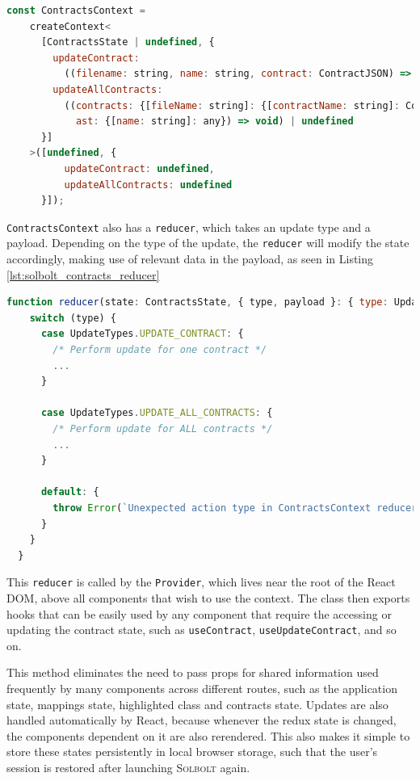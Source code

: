 \begin{lstlisting}[language=Javascript, caption={\texttt{ContractsContext} used for managing contract state}, label={lst:solbolt_contracts_context}, basicstyle=\ttfamily\scriptsize]
  const ContractsContext = 
    createContext<
      [ContractsState | undefined, {
        updateContract: 
          ((filename: string, name: string, contract: ContractJSON) => void) | undefined, 
        updateAllContracts: 
          ((contracts: {[fileName: string]: {[contractName: string]: ContractJSON}}, 
            ast: {[name: string]: any}) => void) | undefined
      }]
    >([undefined, {
          updateContract: undefined, 
          updateAllContracts: undefined
      }]);
\end{lstlisting}

\texttt{ContractsContext} also has a \texttt{reducer}, which takes an update type and a payload.
Depending on the type of the update, the \texttt{reducer} will modify the state accordingly,
making use of relevant data in the payload, as seen in Listing \ref{lst:solbolt_contracts_reducer}

\begin{lstlisting}[language=Javascript, caption={Reducer used in \texttt{ContractsContext}}, label={lst:solbolt_contracts_reducer}, basicstyle=\ttfamily\scriptsize]
  function reducer(state: ContractsState, { type, payload }: { type: UpdateTypes, payload: PayloadType | undefined}) {
    switch (type) {
      case UpdateTypes.UPDATE_CONTRACT: {
        /* Perform update for one contract */
        ...
      }

      case UpdateTypes.UPDATE_ALL_CONTRACTS: {
        /* Perform update for ALL contracts */
        ...
      }

      default: {
        throw Error(`Unexpected action type in ContractsContext reducer: '${type}'.`)
      }
    }
  }
\end{lstlisting}

This \texttt{reducer} is called by the \texttt{Provider}, which lives near the root of
the React DOM, above all components that wish to use the context. The class then exports
hooks that can be easily used by any component that require the accessing or updating 
the contract state, such as \texttt{useContract}, \texttt{useUpdateContract}, and so on.

This method eliminates the need to pass props for shared information used frequently by many
components across different routes, such as the application state, mappings state, highlighted class and
contracts state. Updates are also handled automatically by React, because whenever the 
redux state is changed, the components dependent on it are also rerendered.
This also makes it simple to store these states persistently in local
browser storage, such that the user's session is restored after launching \textcolor{NavyBlue}{\textsc{Solbolt}} again.

